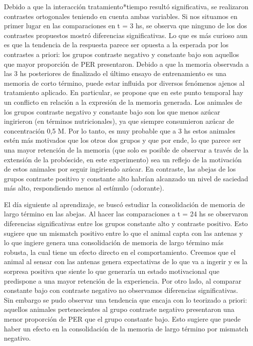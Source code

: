 \documentclass[]{article}
\begin{document}
Debido a que la interacción tratamiento*tiempo resultó significativa, se
realizaron contrastes ortogonales teniendo en cuenta ambas variables. Si
nos situamos en primer lugar en las comparaciones en t = 3 hs, se
observa que ninguno de los dos contrastes propuestos mostró diferencias
significativas. Lo que es más curioso aun es que la tendencia de la
respuesta parece ser opuesta a la esperada por los contrastes a priori:
los grupos contraste negativo y constante bajo son aquellos que mayor
proporción de PER presentaron. Debido a que la memoria observada a las 3
hs posteriores de finalizado el último ensayo de entrenamiento es una
memoria de corto término, puede estar influida por diversos fenómenos
ajenos al tratamiento aplicado. En particular, se propone que en este
punto temporal hay un conflicto en relación a la expresión de la memoria
generada. Los animales de los grupos contraste negativo y constante bajo
son los que menos azúcar ingirieron (en términos nutricionales), ya que
siempre consumieron azúcar de concentración 0,5 M. Por lo tanto, es muy
probable que a 3 hs estos animales estén más motivados que los otros dos
grupos y que por ende, lo que parece ser una mayor retención de la
memoria (que solo es posible de observar a través de la extensión de la
probóscide, en este experimento) sea un reflejo de la motivación de
estos animales por seguir ingiriendo azúcar. En contraste, las abejas de
los grupos contraste positivo y constante alto habrían alcanzado un
nivel de saciedad más alto, respondiendo menos al estímulo (odorante).

El día siguiente al aprendizaje, se buscó estudiar la consolidación de
memoria de largo término en las abejas. Al hacer las comparaciones a t =
24 hs se observaron diferencias significativas entre los grupos
constante alto y contraste positivo. Esto sugiere que un mismatch
positivo entre lo que el animal capta con las antenas y lo que ingiere
genera una consolidación de memoria de largo término más robusta, la
cual tiene un efecto directo en el comportamiento. Creemos que el animal
al sensar con las antenas genera expectativas de lo que va a ingerir y
es la sorpresa positiva que siente lo que generaría un estado
motivacional que predispone a una mayor retención de la experiencia. Por
otro lado, al comparar constante bajo con contraste negativo no
observamos diferencias significativas. Sin embargo se pudo observar una
tendencia que encaja con lo teorizado a priori: aquellos animales
pertenecientes al grupo contraste negativo presentaron una menor
proporción de PER que el grupo constante bajo. Esto sugiere que puede
haber un efecto en la consolidación de la memoria de largo término por
mismatch negativo.
\end{document}
